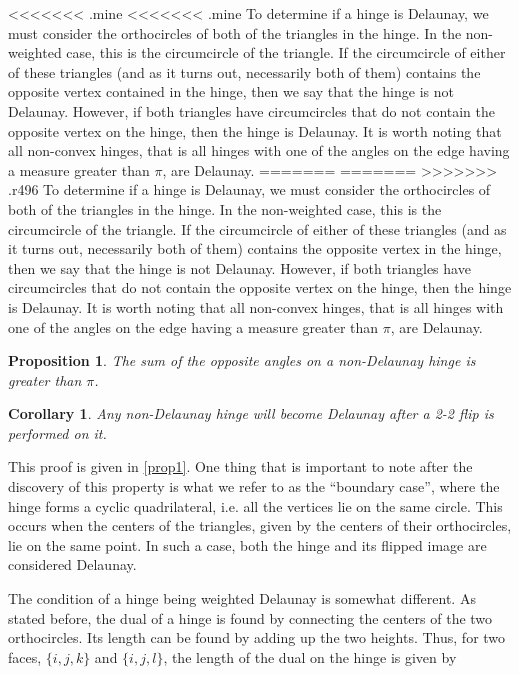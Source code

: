 \documentclass[12pt]{article}
\newtheorem{proposition}[theorem]{Proposition}
\newtheorem{corollary}[theorem]{Corollary}
\begin{document}
<<<<<<< .mine
<<<<<<< .mine
 To determine if a hinge is Delaunay, we must consider the orthocircles of both of the triangles in the hinge. In the non-weighted case, this is the circumcircle of the triangle. If the circumcircle of either of these triangles (and as it turns out, necessarily both of them) contains the opposite vertex contained in the hinge, then we say that the hinge is not Delaunay. However, if both triangles have circumcircles that do not contain the opposite vertex on the hinge, then the hinge is Delaunay. It is worth noting that all non-convex hinges, that is all hinges with one of the angles on the edge having a measure greater than $\pi$, are Delaunay.
=======
=======
>>>>>>> .r496
 To determine if a hinge is Delaunay, we must consider the orthocircles of both of the triangles in the hinge. In the non-weighted case, this is the circumcircle of the triangle. If the circumcircle of either of these triangles (and as it turns out, necessarily both of them) contains the opposite vertex in the hinge, then we say that the hinge is not Delaunay. However, if both triangles have circumcircles that do not contain the opposite vertex on the hinge, then the hinge is Delaunay. It is worth noting that all non-convex hinges, that is all hinges with one of the angles on the edge having a measure greater than $\pi$, are Delaunay.

\begin{proposition}
\label{NonDelProp}
The sum of the opposite angles on a non-Delaunay hinge is greater than $\pi$.
\end{proposition}

\begin{corollary}
\label{FlipProp}
Any non-Delaunay hinge will become Delaunay after a 2-2 flip is performed on it.
\end{corollary}

 This proof is given in \ref{prop1}. One thing that is important to note after the discovery of this property is what we refer to as the ``boundary case'', where the hinge forms a cyclic quadrilateral, i.e. all the vertices lie on the same circle. This occurs when the centers of the triangles, given by the centers of their orthocircles, lie on the same point. In such a case, both the hinge and its flipped image are considered Delaunay.

 The condition of a hinge being weighted Delaunay is somewhat different. As stated before, the dual of a hinge is found by connecting the centers of the two orthocircles. Its length can be found by adding up the two heights. Thus, for two faces, $\{i,j,k\}$ and $\{i,j,l\}$, the length of the dual on the hinge is given by
\end{document}
